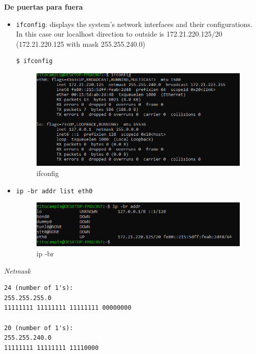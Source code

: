 \documentclass{article}
\newenvironment{blocktemplateIII}[1]{%
    \tcolorbox[beamer,%
    noparskip,breakable,
    ,colframe=Red,%
    colbacklower=LimeGreen!75!LightGreen,%
    title=#1]}%
    {\endtcolorbox}
\newenvironment{codetemplate}[1][]{%
  \mybasecolorbox[#1]
  \itshape
}{%
  \endmybasecolorbox
}
\begin{document}
\textbf{De puertas para fuera}
\begin{itemize}
    \item \verb|ifconfig|: displays the system’s network interfaces and their configurations. In this case our localhost direction to outside is 172.21.220.125/20 (172.21.220.125 with mask 255.255.240.0)
\begin{codetemplate}{}
\begin{verbatim}
$ ifconfig
\end{verbatim}
\end{codetemplate}
\begin{figure}[H]
    \centering
    \includegraphics[scale=0.45]{pictures/image35.PNG}
    \caption{ifconfig}
\end{figure}
    
    \item \verb|ip -br addr list eth0|
    \begin{figure}[H]
    \centering
    \includegraphics[scale=0.45]{pictures/image36.PNG}
    \caption{ip -br}
\end{figure}
\end{itemize}

\begin{blocktemplateIII}{Nota}
\begin{codetemplate}{Netmask}
\begin{verbatim}
24 (number of 1's):
255.255.255.0
11111111 11111111 11111111 00000000

20 (number of 1's):
255.255.240.0
11111111 11111111 11110000
\end{verbatim}
\end{codetemplate}
\end{blocktemplateIII}
\end{document}
